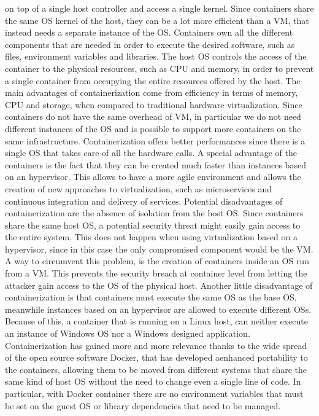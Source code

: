on top of a single host controller and access a single kernel.
Since containers share the same OS kernel of the host, they can be a lot
more efficient than a VM, that instead needs a separate instance of the
OS. Containers own all the different components that are needed in
order to execute the desired software, such as files, environment variables
and libraries. The host OS controls the access of the container to
the physical resources, such as CPU and memory, in order to prevent
a single container from occupying the entire resources offered by the
host.
The main advantages of containerization come from efficiency in
terms of memory, CPU and storage, when compared to traditional
hardware virtualization. Since containers do not have the same overhead
of VM, in particular we do not need different instances of the OS and 
is possible to support more containers on the same infrastructure.
Containerization offers better performances since there is a single OS
that takes care of all the hardware calls. A special advantage 
of the containers is the fact that they can be created much faster than
instances based on an hypervisor. This allows to have a more agile environment and allows the creation of new approaches to virtualization, such as microservices and continuous integration and delivery of services.
Potential disadvantages of containerization are the absence of
isolation from the host OS. Since containers share the same host OS, a
potential security threat might easily gain access to the entire system.
This does not happen when using virtualization based on a hypervisor,
since in this case the only compromised component would be the
VM. A way to circumvent this problem, is the creation of 
containers inside an OS run from a VM. This prevents the
security breach at container level from letting the attacker gain access
to the OS of the physical host. Another little disadvantage of containerization is that containers must execute the same OS as the base OS,
meanwhile instances based on an hypervisor are allowed to execute
different OSs. Because of this, a container that is running on a Linux
host, can neither execute an instance of Windows OS nor a Windows
designed application.
Containerization has gained more and more relevance thanks to
the wide spread of the open source software Docker, that has developed
aenhanced portability to the containers, allowing them to
be moved from different systems that share the same kind of host
OS without the need to change even a single line of code. In particular, with
Docker container there are no environment variables that must be set
on the guest OS or library dependencies that need to be managed.

